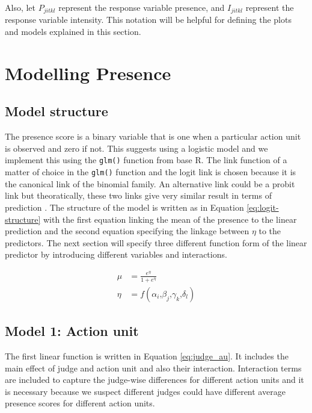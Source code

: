 \documentclass{monashthesis}
\begin{document}
\noindent Also, let \(P_{jitkl}\) represent the response variable presence, and \(I_{jitkl}\) represent the response variable intensity. This notation will be helpful for defining the plots and models explained in this section.

\hypertarget{modelling-presence}{%
\section{Modelling Presence}\label{modelling-presence}}

\hypertarget{model-structure}{%
\subsection{Model structure}\label{model-structure}}

The presence score is a binary variable that is one when a particular action unit is observed and zero if not. This suggests using a logistic model and we implement this using the \texttt{glm()} function from base R. The link function of a matter of choice in the \texttt{glm()} function and the logit link is chosen because it is the canonical link of the binomial family. An alternative link could be a probit link but theoratically, these two links give very similar result in terms of prediction \textcite{faraway2016extending}. The structure of the model is written as in Equation \ref{eq:logit-structure} with the first equation linking the mean of the presence to the linear prediction and the second equation specifying the linkage between \(\eta\) to the predictors. The next section will specify three different function form of the linear predictor by introducing different variables and interactions.

\begin{align}\label{eq:logit-structure}
\mu &= \frac{e^{\eta}}{1 + e^{\eta}} \\
\eta &= f(\alpha_i\text{,}\beta_j\text{,}\gamma_k\text{,}\delta_l)
\end{align}

\hypertarget{model-1-action-unit}{%
\subsection{Model 1: Action unit}\label{model-1-action-unit}}

The first linear function is written in Equation \ref{eq:judge_au}. It includes the main effect of judge and action unit and also their interaction. Interaction terms are included to capture the judge-wise differences for different action units and it is necessary because we suspect different judges could have different average presence scores for different action units.
\end{document}
